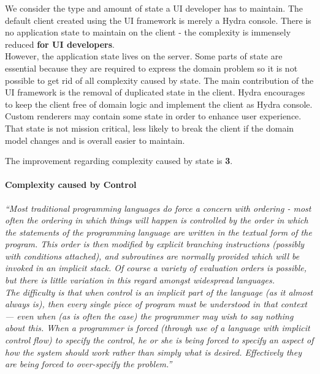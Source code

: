We consider the type and amount of state a UI developer has to maintain. The default client created using the UI framework is merely a Hydra console. There is no application state to maintain on the client - the complexity is immensely reduced \textbf{for UI developers}. \\
However, the application state lives on the server. Some parts of state are essential because they are required to express the domain problem so it is not possible to get rid of all complexity caused by state. The main contribution of the UI framework is the removal of duplicated state in the client. Hydra encourages to keep the client free of domain logic and implement the client as Hydra console. Custom renderers may contain some state in order to enhance user experience. That state is not mission critical, less likely to break the client if the domain model changes and is overall easier to maintain.

The improvement regarding complexity caused by state is \textbf{3}.

\paragraph{Complexity caused by Control}
\textit{``Most traditional programming languages do force a concern with ordering - most often the ordering in which things will happen is controlled by the order in which the statements of the programming language are written in the textual form of the program. This order is then modified by explicit branching instructions (possibly with conditions attached), and subroutines are normally provided which will be invoked in an implicit stack. Of course a variety of evaluation orders is possible, but there is little variation in this regard amongst widespread languages. \\ The difficulty is that when control is an implicit part of the language (as it almost always is), then every single piece of program must be understood in that context — even when (as is often the case) the programmer may wish to say nothing about this. When a programmer is forced (through use of a language with implicit control flow) to specify the control, he or she is being forced to specify an aspect of how the system should work rather than simply what is desired. Effectively they are being forced to over-specify the problem.''} \citep[p.~8]{outoftarpit}

